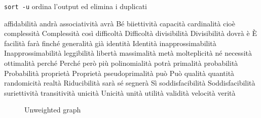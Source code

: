 \texttt{sort -u} ordina l'output ed elimina i duplicati

affidabilità
andrà
associatività
avrà
Bé
biiettività
capacità
cardinalità
cioè
complessità
Complessità
così
difficoltà
Difficoltà
divisibilità
Divisibilità
dovrà
è
È
facilità
farà
finché
generalità
già
identità
Identità
inapprossimabilità
Inapprossimabilità
leggibilità
libertà
massimalità
metà
molteplicità
né
necessità
ottimalità
perché
Perché
però
più
polinomialità
potrà
primalità
probabilità
Probabilità
proprietà
Proprietà
pseudoprimalità
può
Può
qualità
quantità
randomicità
realtà
Riducibilità
sarà
sé
segnerà
Sì
soddisfacibilità
Soddisfacibilità
suriettività
transitività
unicità
Unicità
unità
utilità
validità
velocità
verità


\begin{figure}[h]
    \centering
    \caption{Unweighted graph}
    \label{fig:ug}
\end{figure}


